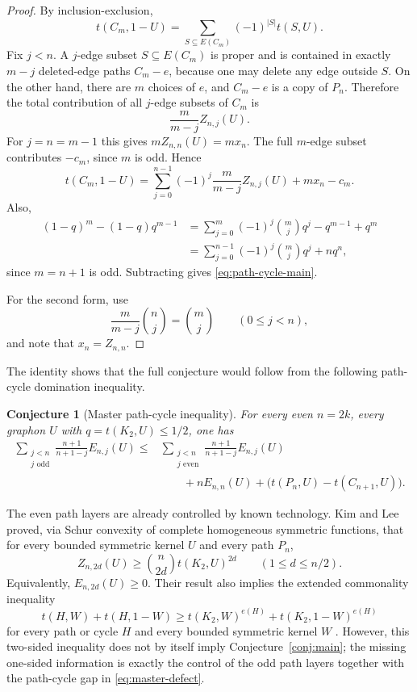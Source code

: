\documentclass[11pt]{article}
\newtheorem{conjecture}[theorem]{Conjecture}
\theoremstyle{definition}
\theoremstyle{remark}
\newcommand{\0}{\mathbf 0}
\begin{document}
\begin{proof}
By inclusion-exclusion,
\[
        t(C_m,1-U)=\sum_{S\subseteq E(C_m)}(-1)^{|S|}t(S,U).
\]
Fix $j<n$.  A $j$-edge subset $S\subseteq E(C_m)$ is proper and is contained in exactly $m-j$ deleted-edge paths $C_m-e$, because one may delete any edge outside $S$.  On the other hand, there are $m$ choices of $e$, and $C_m-e$ is a copy of $P_n$.  Therefore the total contribution of all $j$-edge subsets of $C_m$ is
\[
        \frac{m}{m-j}Z_{n,j}(U).
\]
For $j=n=m-1$ this gives $mZ_{n,n}(U)=mx_n$.  The full $m$-edge subset contributes $-c_m$, since $m$ is odd.  Hence
\[
        t(C_m,1-U)
        =
        \sum_{j=0}^{n-1}(-1)^j\frac{m}{m-j}Z_{n,j}(U)
        +mx_n-c_m.
\]
Also,
\begin{align*}
(1-q)^m-(1-q)q^{m-1}
&=
\sum_{j=0}^{m}(-1)^j\binom mj q^j-q^{m-1}+q^m\\
&=
\sum_{j=0}^{n-1}(-1)^j\binom mj q^j+nq^n,
\end{align*}
since $m=n+1$ is odd.  Subtracting gives \eqref{eq:path-cycle-main}.

For the second form, use
\[
        \frac{m}{m-j}\binom nj=\binom mj
        \qquad(0\le j<n),
\]
and note that $x_n=Z_{n,n}$.
\end{proof}

The identity shows that the full conjecture would follow from the following path-cycle domination inequality.

\begin{conjecture}[Master path-cycle inequality]\label{conj:master-path-cycle}
For every even $n=2k$, every graphon $U$ with $q=t(K_2,U)\le1/2$, one has
\begin{align*}
\sum_{\substack{j<n\\ j\text{ odd}}}
        \frac{n+1}{n+1-j}E_{n,j}(U)
\le{}&
\sum_{\substack{j<n\\ j\text{ even}}}
        \frac{n+1}{n+1-j}E_{n,j}(U) \\
&\qquad
+nE_{n,n}(U)+\bigl(t(P_n,U)-t(C_{n+1},U)\bigr).
\end{align*}
\end{conjecture}

The even path layers are already controlled by known technology.  Kim and Lee proved, via Schur convexity of complete homogeneous symmetric functions, that for every bounded symmetric kernel $U$ and every path $P_n$,
\begin{equation}\label{eq:kim-lee-even}
        Z_{n,2d}(U)\ge \binom n{2d}t(K_2,U)^{2d}
        \qquad(1\le d\le n/2).
\end{equation}
Equivalently, $E_{n,2d}(U)\ge0$.  Their result also implies the extended commonality inequality
\[
        t(H,W)+t(H,1-W)
        \ge
        t(K_2,W)^{e(H)}+t(K_2,1-W)^{e(H)}
\]
for every path or cycle $H$ and every bounded symmetric kernel $W$ \cite{KimLee2022}.  However, this two-sided inequality does not by itself imply Conjecture~\ref{conj:main}; the missing one-sided information is exactly the control of the odd path layers together with the path-cycle gap in \eqref{eq:master-defect}.
\end{document}
